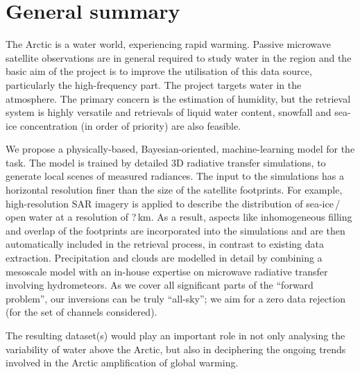 \documentclass[12pt,oneside,a4paper]{article}
\begin{document}
	
	
	\thispagestyle{empty}
	\vspace*{-10mm}
	\noindent
	\textbf{\Large \LongTitle}




\section{General summary}
%
The Arctic is a water world, experiencing rapid warming. Passive microwave 
satellite observations are in general required to study water in the region and
the basic aim of the project is to improve the utilisation of this data source,
particularly the high-frequency part. The project targets water in the
atmosphere. The primary concern is the estimation of humidity, but the retrieval
system is highly versatile and retrievals of liquid water content, snowfall and
sea-ice concentration (in order of priority) are also feasible.

We propose a physically-based, Bayesian-oriented, machine-learning model for
the task. The model is trained by detailed 3D radiative transfer simulations,
to generate local scenes of measured radiances. The input to the simulations
has a horizontal resolution finer than the size of the satellite footprints.
For example, high-resolution SAR imagery is applied to describe the
distribution of sea-ice\,/\,open water at a resolution of ?\,km. As a result,
aspects like inhomogeneous filling and overlap of the footprints are
incorporated into the simulations and are then automatically included in the
retrieval process, in contrast to existing data extraction. Precipitation and
clouds are modelled in detail by combining a mesoscale model with an in-house
expertise on microwave radiative transfer involving hydrometeors. As we cover
all significant parts of the ``forward problem'', our inversions can be truly
``all-sky''; we aim for a zero data rejection (for the set of channels
considered).

The resulting dataset(s) would play an important role in not only analysing the
variability of water above the Arctic, but also in deciphering the
ongoing trends involved in the Arctic amplification of global warming.
\end{document}
